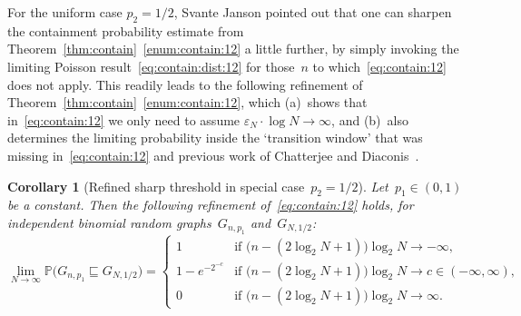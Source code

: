 \documentclass{article}
\newcommand{\eps}{\varepsilon}
\renewcommand{\Pr}{\mathbb{P}}
\newcommand{\isub}{\sqsubseteq}
\newtheorem{cor}[thm]{Corollary}
\newcommand\bigpar[1]{\bigl(#1\bigr)}
\begin{document}
For the uniform case $p_2=1/2$, Svante Janson pointed out that one can sharpen the containment probability estimate from Theorem~\ref{thm:contain}~\ref{enum:contain:12} a little further, 
by simply invoking the limiting Poisson result~\eqref{eq:contain:dist:12} for those~$n$ to which~\eqref{eq:contain:12} does not apply.  
This readily leads to the following refinement of Theorem~\ref{thm:contain}~\ref{enum:contain:12}, 
which (a)~shows that in~\eqref{eq:contain:12} we only need to assume ${\eps_N \cdot \log N \to \infty}$,
and (b)~also determines the limiting probability inside the `transition window' 
that was missing in~\eqref{eq:contain:12} and previous work of Chatterjee and Diaconis~\cite{chatterjee2021isomorphisms}. \begin{cor}[Refined sharp threshold in special case~$p_2=1/2$]\label{cor:contain}Let~$p_1\in (0,1)$ be a constant. 
Then the following refinement of~\eqref{eq:contain:12} holds, for independent binomial random graphs~$G_{n,p_1}$ and~$G_{N,1/2}$:\begin{equation}
\lim_{N \to \infty}\Pr\bigpar{G_{n,p_1}\isub G_{N,1/2}} = \begin{cases} 1 \ \ \ \ & \text{if $\bigpar{n-(2\log_2 N+1)}\log_2 N \to -\infty$,}\\ 
1-e^{-2^{-c}} & \text{if $\bigpar{n-(2\log_2 N+1)}\log_2 N \to c \in (-\infty,\infty)$,}\\
0 \ \ \ \ & \text{if $\bigpar{n-(2\log_2 N+1)}\log_2 N \to \infty$.}\end{cases}\end{equation}\end{cor}




\pagebreak[3]
\end{document}
